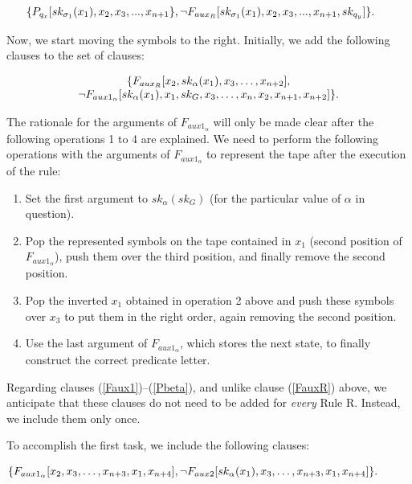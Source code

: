 \documentclass[%
  manuscript=article,   %
  year=2024,
  volume=77,
  doi=10.59203/zfn.77.694,
]{zfn}
\begin{document}
\begin{equation}
\hspace{-0.5cm} \{P_{q_x}[sk_{\sigma_1}(x_1), x_2, x_3, ..., x_{n+1}\},
 \neg F_{aux_R}[sk_{\sigma_1}(x_1), x_2, x_3, ..., x_{n+1},sk_{q_y}]\}. \label{FauxR}
\end{equation}

Now, we start moving the symbols to the right. Initially, we add the following clauses to the set of clauses:

\begin{equation}
\begin{tabular}{c}$\{F_{aux_R}[x_2, sk_\alpha(x_1), x_3, \dots , x_{n+2}],$ \\
$\neg F_{aux1_\alpha}[sk_\alpha(x_1), x_1, sk_G, x_3, \ldots, x_{n}, x_2, x_{n+1},x_{n+2}]\}.$\end{tabular} \label{Faux1}
\end{equation}

The rationale for the arguments of $F_{aux1_\alpha}$ will only be made clear after the following operations 1 to 4 are explained. We need to perform the following operations with the arguments of $F_{aux1_\alpha}$ to represent the tape after the execution of the rule:

\begin{enumerate}
\item Set the first argument to $sk_\alpha(sk_G)$ (for the particular value of $\alpha$ in question).
\item Pop the represented symbols on the tape contained in $x_1$ (second position of $F_{aux1_\alpha}$), push them over the third position, and finally remove the second position.
\item Pop the inverted $x_1$ obtained in operation 2 above and push these symbols over $x_3$ to put them in the right order, again removing the second position.
\item Use the last argument of $F_{aux1_\alpha}$, which stores the next state, to finally construct the correct predicate letter.
\end{enumerate}

Regarding clauses (\ref{Faux1})--(\ref{Pbeta}), and unlike clause (\ref{FauxR}) above, we anticipate that these clauses do not need to be added for \textit{every} Rule R. Instead, we include them only once.

To accomplish the first task, we include the following clauses:

\begin{small}
\begin{equation}
  \hspace{-1cm}  \{F_{aux1_\alpha}[x_2, x_3, \ldots, x_{n+3}, x_1, x_{n+4}], \neg F_{aux2}[sk_\alpha(x_1), x_3, \ldots, x_{n+3}, x_1, x_{n+4}]\}.\label{Faux2}
\end{equation}
\end{small}
\end{document}
